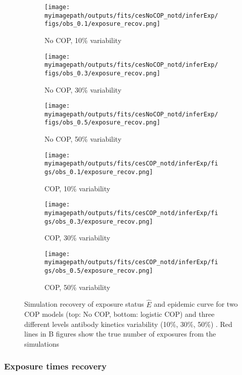 \begin{figure}[H]

    \centering
    \begin{subfigure}{0.31\textwidth}
        \centering
        \texttt{[image: \\myimagepath/outputs/fits/cesNoCOP\_notd/inferExp/figs/obs\_0.1/exposure\_recov.png]}
        \caption{No COP, 10\% variability \label{fit1:inf}}
    \end{subfigure}
    \begin{subfigure}{0.31\textwidth}
        \centering
        \texttt{[image: \\myimagepath/outputs/fits/cesNoCOP\_notd/inferExp/figs/obs\_0.3/exposure\_recov.png]}
        \caption{No COP, 30\% variability}
    \end{subfigure}
    \begin{subfigure}{0.31\textwidth}
        \centering
        \texttt{[image: \\myimagepath/outputs/fits/cesNoCOP\_notd/inferExp/figs/obs\_0.5/exposure\_recov.png]}
        \caption{No COP, 50\% variability}
    \end{subfigure}
    
  \begin{subfigure}{0.31\textwidth}
        \centering
        \texttt{[image: \\myimagepath/outputs/fits/cesCOP\_notd/inferExp/figs/obs\_0.1/exposure\_recov.png]}
        \caption{ COP, 10\% variability}
    \end{subfigure}
    \begin{subfigure}{0.31\textwidth}
        \centering
        \texttt{[image: \\myimagepath/outputs/fits/cesCOP\_notd/inferExp/figs/obs\_0.3/exposure\_recov.png]}
        \caption{ COP, 30\% variability}
    \end{subfigure}
    \begin{subfigure}{0.31\textwidth}
        \centering
        \texttt{[image: \\myimagepath/outputs/fits/cesCOP\_notd/inferExp/figs/obs\_0.5/exposure\_recov.png]}
        \caption{ COP, 50\% variability}
    \end{subfigure}
    
    \caption{Simulation recovery of exposure status $\hat{E}$ and epidemic curve for two COP models (top: No COP, bottom: logistic COP) and three different levels antibody kinetics variability (10\%, 30\%, 50\%) \label{fit2:exp}. Red lines in B figures show the true number of exposures from the simulations }
\end{figure}


\subsubsection{Exposure times recovery}
